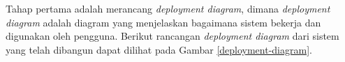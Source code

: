 									
									
   	Tahap pertama adalah merancang \textit{deployment diagram}, dimana \textit{deployment diagram} adalah diagram yang menjelaskan bagaimana sistem bekerja dan digunakan oleh pengguna. Berikut rancangan \textit{deployment diagram} dari sistem yang telah dibangun dapat dilihat pada Gambar \ref{deployment-diagram}.
   		
